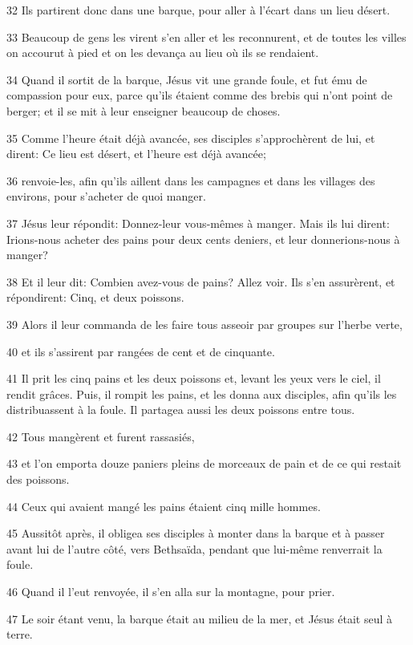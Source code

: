 \par 32 Ils partirent donc dans une barque, pour aller à l'écart dans un lieu désert.
\par 33 Beaucoup de gens les virent s'en aller et les reconnurent, et de toutes les villes on accourut à pied et on les devança au lieu où ils se rendaient.
\par 34 Quand il sortit de la barque, Jésus vit une grande foule, et fut ému de compassion pour eux, parce qu'ils étaient comme des brebis qui n'ont point de berger; et il se mit à leur enseigner beaucoup de choses.
\par 35 Comme l'heure était déjà avancée, ses disciples s'approchèrent de lui, et dirent: Ce lieu est désert, et l'heure est déjà avancée;
\par 36 renvoie-les, afin qu'ils aillent dans les campagnes et dans les villages des environs, pour s'acheter de quoi manger.
\par 37 Jésus leur répondit: Donnez-leur vous-mêmes à manger. Mais ils lui dirent: Irions-nous acheter des pains pour deux cents deniers, et leur donnerions-nous à manger?
\par 38 Et il leur dit: Combien avez-vous de pains? Allez voir. Ils s'en assurèrent, et répondirent: Cinq, et deux poissons.
\par 39 Alors il leur commanda de les faire tous asseoir par groupes sur l'herbe verte,
\par 40 et ils s'assirent par rangées de cent et de cinquante.
\par 41 Il prit les cinq pains et les deux poissons et, levant les yeux vers le ciel, il rendit grâces. Puis, il rompit les pains, et les donna aux disciples, afin qu'ils les distribuassent à la foule. Il partagea aussi les deux poissons entre tous.
\par 42 Tous mangèrent et furent rassasiés,
\par 43 et l'on emporta douze paniers pleins de morceaux de pain et de ce qui restait des poissons.
\par 44 Ceux qui avaient mangé les pains étaient cinq mille hommes.
\par 45 Aussitôt après, il obligea ses disciples à monter dans la barque et à passer avant lui de l'autre côté, vers Bethsaïda, pendant que lui-même renverrait la foule.
\par 46 Quand il l'eut renvoyée, il s'en alla sur la montagne, pour prier.
\par 47 Le soir étant venu, la barque était au milieu de la mer, et Jésus était seul à terre.
